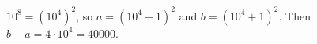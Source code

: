 $10^8=\left(10^4\right)^2$, so $a=\left(10^4-1\right)^2$ and $b=\left(10^4+1\right)^2$. Then $b-a=4\cdot10^4=\boxed{40000}$.
